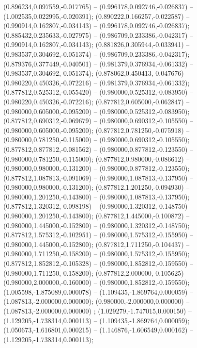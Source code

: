  (0.896234,0.097559,-0.017765) -- (0.996178,0.092746,-0.026837) -- (1.002535,0.022995,-0.020391);
 (0.890222,0.166257,-0.022587) -- (0.990914,0.162807,-0.034143) -- (0.996178,0.092746,-0.026837);
 (0.885432,0.235633,-0.027975) -- (0.986709,0.233386,-0.042317) -- (0.990914,0.162807,-0.034143);
 (0.881826,0.305944,-0.033941) -- (0.983537,0.304692,-0.051374) -- (0.986709,0.233386,-0.042317);
 (0.879376,0.377449,-0.040501) -- (0.981379,0.376934,-0.061332) -- (0.983537,0.304692,-0.051374);
 (0.878062,0.450413,-0.047676) -- (0.980220,0.450326,-0.072216) -- (0.981379,0.376934,-0.061332);
 (0.877812,0.525312,-0.055420) -- (0.980000,0.525312,-0.083950) -- (0.980220,0.450326,-0.072216);
 (0.877812,0.605000,-0.062847) -- (0.980000,0.605000,-0.095200) -- (0.980000,0.525312,-0.083950);
 (0.877812,0.690312,-0.069679) -- (0.980000,0.690312,-0.105550) -- (0.980000,0.605000,-0.095200);
 (0.877812,0.781250,-0.075918) -- (0.980000,0.781250,-0.115000) -- (0.980000,0.690312,-0.105550);
 (0.877812,0.877812,-0.081562) -- (0.980000,0.877812,-0.123550) -- (0.980000,0.781250,-0.115000);
 (0.877812,0.980000,-0.086612) -- (0.980000,0.980000,-0.131200) -- (0.980000,0.877812,-0.123550);
 (0.877812,1.087813,-0.091069) -- (0.980000,1.087813,-0.137950) -- (0.980000,0.980000,-0.131200);
 (0.877812,1.201250,-0.094930) -- (0.980000,1.201250,-0.143800) -- (0.980000,1.087813,-0.137950);
 (0.877812,1.320312,-0.098198) -- (0.980000,1.320312,-0.148750) -- (0.980000,1.201250,-0.143800);
 (0.877812,1.445000,-0.100872) -- (0.980000,1.445000,-0.152800) -- (0.980000,1.320312,-0.148750);
 (0.877812,1.575312,-0.102951) -- (0.980000,1.575312,-0.155950) -- (0.980000,1.445000,-0.152800);
 (0.877812,1.711250,-0.104437) -- (0.980000,1.711250,-0.158200) -- (0.980000,1.575312,-0.155950);
 (0.877812,1.852812,-0.105328) -- (0.980000,1.852812,-0.159550) -- (0.980000,1.711250,-0.158200);
 (0.877812,2.000000,-0.105625) -- (0.980000,2.000000,-0.160000) -- (0.980000,1.852812,-0.159550);
 (1.005598,-1.875089,0.000078) -- (1.109435,-1.869764,0.000059) -- (1.087813,-2.000000,0.000000);
 (0.980000,-2.000000,0.000000) -- (1.087813,-2.000000,0.000000) ;
 (1.029279,-1.747015,0.000150) -- (1.129205,-1.738314,0.000113) -- (1.109435,-1.869764,0.000059);
 (1.050673,-1.616801,0.000215) -- (1.146876,-1.606549,0.000162) -- (1.129205,-1.738314,0.000113);
